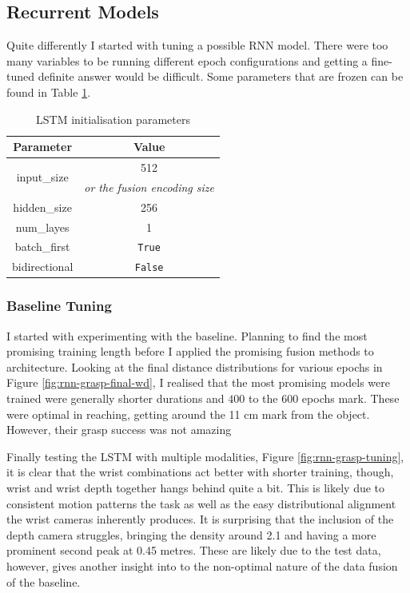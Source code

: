 \subsection{Recurrent Models}
Quite differently I started with tuning a possible RNN model. There were too many variables to be running different epoch configurations and getting a fine-tuned definite answer would be difficult. Some parameters that are frozen can be found in Table \ref{tab:rnn-params}.

\begin{table}[ht]
\centering
  \begin{tabular}{|| c | c ||}
  \hline
  Parameter & Value \\
  \hline
  \multirow{2}{*}{input\_size} & 512 \\
  & \emph{or the fusion encoding size} \\
  \hline
  hidden\_size & 256\\
  num\_layes & 1 \\
  batch\_first & \texttt{True} \\
  bidirectional & \texttt{False} \\
  \hline
  \end{tabular}\caption{LSTM initialisation parameters}\label{tab:rnn-params}
\end{table}

\subsubsection{Baseline Tuning}
I started with experimenting with the baseline. Planning to find the most promising training length before I applied the promising fusion methods to architecture. Looking at the final distance distributions for various epochs in Figure \ref{fig:rnn-grasp-final-wd}, I realised that the most promising models were trained were generally shorter durations and $400$ to the $600$ epochs mark. These were optimal in reaching, getting around the 11 cm mark from the object. However, their grasp success was not amazing 

Finally testing the LSTM with multiple modalities, Figure \ref{fig:rnn-grasp-tuning}, it is clear that the wrist combinations act better with shorter training, though, wrist and wrist depth together hangs behind quite a bit. This is likely due to consistent motion patterns the task as well as the easy distributional alignment the wrist cameras inherently produces. It is surprising that the inclusion of the depth camera struggles, bringing the density around 2.1 and having a more prominent second peak at 0.45 metres. These are likely due to the test data, however, gives another insight into to the non-optimal nature of the data fusion of the baseline.

